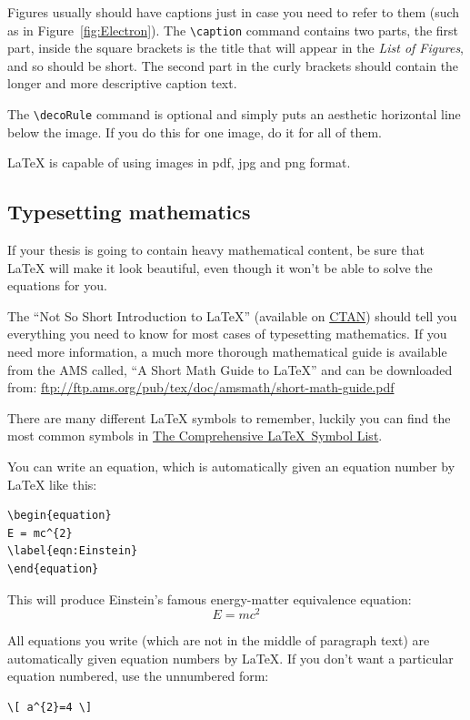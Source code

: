 Figures usually should have captions just in case you need to refer to them (such as in Figure~\cref{fig:Electron}).
The \verb|\caption| command contains two parts, the first part, inside the square brackets is the title that will appear in the \emph{List of Figures}, and so should be short.
The second part in the curly brackets should contain the longer and more descriptive caption text.

The \verb|\decoRule| command is optional and simply puts an aesthetic horizontal line below the image.
If you do this for one image, do it for all of them.

\LaTeX{} is capable of using images in pdf, jpg and png format.

\subsection{Typesetting mathematics}

If your thesis is going to contain heavy mathematical content, be sure that \LaTeX{} will make it look beautiful, even though it won't be able to solve the equations for you.

The \enquote{Not So Short Introduction to \LaTeX} (available on \href{http://www.ctan.org/tex-archive/info/lshort/english/lshort.pdf}{CTAN}) should tell you everything you need to know for most cases of typesetting mathematics.
If you need more information, a much more thorough mathematical guide is available from the AMS called, \enquote{A Short Math Guide to \LaTeX} and can be downloaded from:
\url{ftp://ftp.ams.org/pub/tex/doc/amsmath/short-math-guide.pdf}

There are many different \LaTeX{} symbols to remember, luckily you can find the most common symbols in \href{http://ctan.org/pkg/comprehensive}{The Comprehensive \LaTeX~Symbol List}.

You can write an equation, which is automatically given an equation number by \LaTeX{} like this:
\begin{verbatim}
\begin{equation}
E = mc^{2}
\label{eqn:Einstein}
\end{equation}
\end{verbatim}

This will produce Einstein's famous energy-matter equivalence equation:
\begin{equation}
E = mc^{2}
\label{eqn:Einstein}
\end{equation}

All equations you write (which are not in the middle of paragraph text) are automatically given equation numbers by \LaTeX{}. If you don't want a particular equation numbered, use the unnumbered form:
\begin{verbatim}
\[ a^{2}=4 \]
\end{verbatim}

